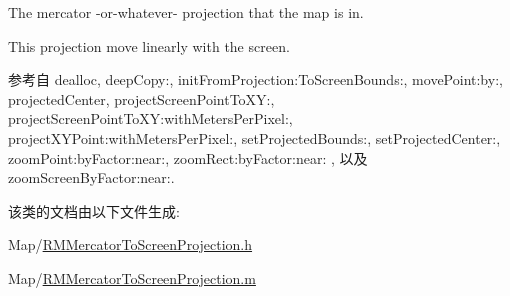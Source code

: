 The mercator -\/or-\/whatever-\/ projection that the map is in. 

This projection move linearly with the screen. 

参考自 dealloc, deep\-Copy\-:, init\-From\-Projection\-:\-To\-Screen\-Bounds\-:, move\-Point\-:by\-:, projected\-Center, project\-Screen\-Point\-To\-X\-Y\-:, project\-Screen\-Point\-To\-X\-Y\-:with\-Meters\-Per\-Pixel\-:, project\-X\-Y\-Point\-:with\-Meters\-Per\-Pixel\-:, set\-Projected\-Bounds\-:, set\-Projected\-Center\-:, zoom\-Point\-:by\-Factor\-:near\-:, zoom\-Rect\-:by\-Factor\-:near\-: , 以及 zoom\-Screen\-By\-Factor\-:near\-:.



该类的文档由以下文件生成\-:\begin{DoxyCompactItemize}
\item 
Map/\hyperlink{_r_m_mercator_to_screen_projection_8h}{R\-M\-Mercator\-To\-Screen\-Projection.\-h}\item 
Map/\hyperlink{_r_m_mercator_to_screen_projection_8m}{R\-M\-Mercator\-To\-Screen\-Projection.\-m}\end{DoxyCompactItemize}
